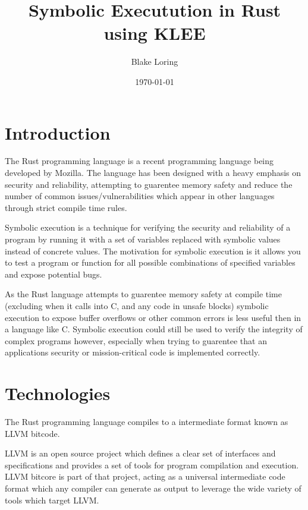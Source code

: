 \documentclass{report}
\begin{document}
\usepackage{listings}

\title{Symbolic Executution in Rust using KLEE}
\author{Blake Loring}
\date{\today}

\maketitle

\chapter {Introduction}

The Rust programming language is a recent programming language being developed by Mozilla. The language has been designed with a heavy emphasis on security and reliability, attempting to guarentee memory safety and reduce the number of common issues/vulnerabilities which appear in other languages through strict compile time rules.

Symbolic execution is a technique for verifying the security and reliability of a program by running it with a set of variables replaced with symbolic values instead of concrete values. The motivation for symbolic execution is it allows you to test a program or function for all possible combinations of specified variables and expose potential bugs.

As the Rust language attempts to guarentee memory safety at compile time (excluding when it calls into C, and any code in unsafe blocks) symbolic execution to expose buffer overflows or other common errors is less useful then in a language like C. Symbolic execution could still be used to verify the integrity of complex programs however, especially when trying to guarentee that an applications security or mission-critical code is implemented correctly.

\chapter {Technologies}

The Rust programming language compiles to a intermediate format known as LLVM bitcode.

LLVM is an open source project which defines a clear set of interfaces and specifications and provides a set of tools for program compilation and execution. LLVM bitcore is part of that project, acting as a universal intermediate code format which any compiler can generate as output to leverage the wide variety of tools which target LLVM.
\end{document}
